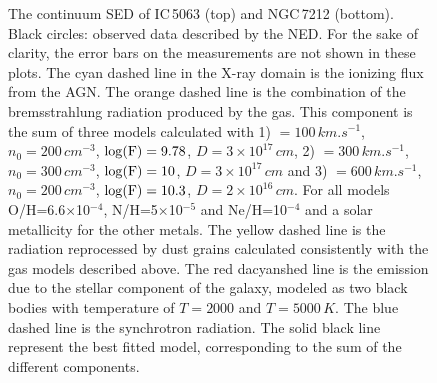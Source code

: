 \documentclass[../main.tex]{subfiles}
\begin{document}
\begin{figure}
\caption{The continuum SED of IC\,5063 (top) and NGC\,7212 (bottom).
Black circles: observed data described by the NED. For the sake of clarity, the error bars on the measurements are not shown in these plots.
The cyan dashed line in the X-ray domain is the ionizing flux from the AGN.
The orange dashed line is the combination of the bremsstrahlung radiation produced by the gas. This component is the sum of three models calculated with 1) \Vs $=100\,\si{km.s^{-1}}$, $n_0 =200\,\si{cm^{-3}}$, $\log(\rm F)=9.78$, $D=3\times10^{17}\,\si{cm}$, 2) \Vs $=300\,\si{km.s^{-1}}$, $n_0 =300\,\si{cm^{-3}}$, $\log(\rm F)=10$, $D=3\times10^{17}\,\si{cm}$ and 3)  \Vs $=600\,\si{km.s^{-1}}$, $n_0 =200\,\si{cm^{-3}}$, $\log(\rm F)=10.3$, $D=2\times10^{16}\,\si{cm}$. For all models O/H=6.6$\times$10$^{-4}$, N/H=5$\times$10$^{-5}$ and Ne/H=10$^{-4}$ and a solar metallicity for the other metals. 
The yellow dashed line is the radiation reprocessed by dust grains calculated consistently with the gas models described above.
The red dacyanshed line is the emission due to the stellar component of the galaxy, modeled as two black bodies with temperature of $T=2000$ and $T=5000\,\si{K}$.
The blue dashed line is the synchrotron radiation.
The solid black line represent the best fitted model, corresponding to the sum of the different components.}
\label{fig:SED}
\end{figure}
\end{document}
